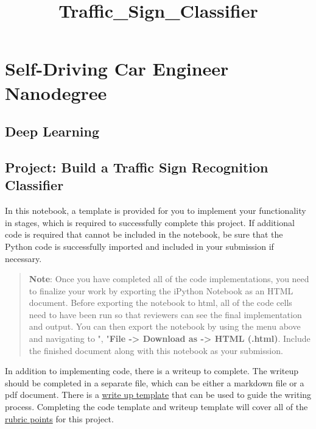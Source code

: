 \documentclass[11pt]{article}
\title{Traffic\_Sign\_Classifier}
\begin{document}
    
    
    \maketitle
    
    

    
    \section{Self-Driving Car Engineer
Nanodegree}\label{self-driving-car-engineer-nanodegree}

\subsection{Deep Learning}\label{deep-learning}

\subsection{Project: Build a Traffic Sign Recognition
Classifier}\label{project-build-a-traffic-sign-recognition-classifier}

In this notebook, a template is provided for you to implement your
functionality in stages, which is required to successfully complete this
project. If additional code is required that cannot be included in the
notebook, be sure that the Python code is successfully imported and
included in your submission if necessary.

\begin{quote}
\textbf{Note}: Once you have completed all of the code implementations,
you need to finalize your work by exporting the iPython Notebook as an
HTML document. Before exporting the notebook to html, all of the code
cells need to have been run so that reviewers can see the final
implementation and output. You can then export the notebook by using the
menu above and navigating to \n", "\textbf{File -\textgreater{} Download
as -\textgreater{} HTML (.html)}. Include the finished document along
with this notebook as your submission.
\end{quote}

In addition to implementing code, there is a writeup to complete. The
writeup should be completed in a separate file, which can be either a
markdown file or a pdf document. There is a
\href{https://github.com/udacity/CarND-Traffic-Sign-Classifier-Project/blob/master/writeup_template.md}{write
up template} that can be used to guide the writing process. Completing
the code template and writeup template will cover all of the
\href{https://review.udacity.com/\#!/rubrics/481/view}{rubric points}
for this project.
\end{document}
